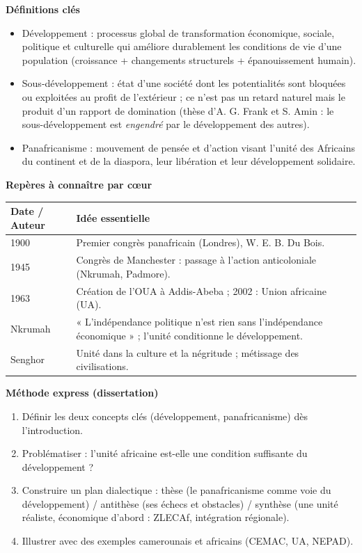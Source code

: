 \documentclass[11pt]{article}
\newcommand{\cle}[1]{{\popxbold\color{popdark}#1}}
\begin{document}
\begin{bilan}
\textbf{Définitions clés}
\begin{itemize}
  \item \cle{Développement} : processus global de transformation économique, sociale, politique et culturelle qui améliore durablement les conditions de vie d'une population (croissance + changements structurels + épanouissement humain).
  \item \cle{Sous-développement} : état d'une société dont les potentialités sont bloquées ou exploitées au profit de l'extérieur ; ce n'est pas un retard naturel mais le produit d'un rapport de \cle{domination} (thèse d'A. G. Frank et S. Amin : le sous-développement est \emph{engendré} par le développement des autres).
  \item \cle{Panafricanisme} : mouvement de pensée et d'action visant l'unité des Africains du continent et de la diaspora, leur libération et leur développement solidaire.
\end{itemize}

\textbf{Repères à connaître par cœur}
\begin{center}
\begin{tabularx}{\linewidth}{|l|X|}
\hline
\rowcolor{popblueL} \textbf{Date / Auteur} & \textbf{Idée essentielle} \\
\hline
1900 & Premier congrès panafricain (Londres), W. E. B. Du Bois. \\
\hline
1945 & Congrès de Manchester : passage à l'action anticoloniale (Nkrumah, Padmore). \\
\hline
1963 & Création de l'OUA à Addis-Abeba ; 2002 : Union africaine (UA). \\
\hline
Nkrumah & « L'indépendance politique n'est rien sans l'indépendance économique » ; l'unité conditionne le développement. \\
\hline
Senghor & Unité dans la culture et la négritude ; métissage des civilisations. \\
\hline
\end{tabularx}
\end{center}

\textbf{Méthode express (dissertation)}
\begin{enumerate}
  \item Définir les deux concepts clés (développement, panafricanisme) dès l'introduction.
  \item Problématiser : l'unité africaine est-elle une condition suffisante du développement ?
  \item Construire un plan dialectique : thèse (le panafricanisme comme voie du développement) / antithèse (ses échecs et obstacles) / synthèse (une unité réaliste, économique d'abord : ZLECAf, intégration régionale).
  \item Illustrer avec des exemples camerounais et africains (CEMAC, UA, NEPAD).
\end{enumerate}
\end{bilan}
\end{document}
